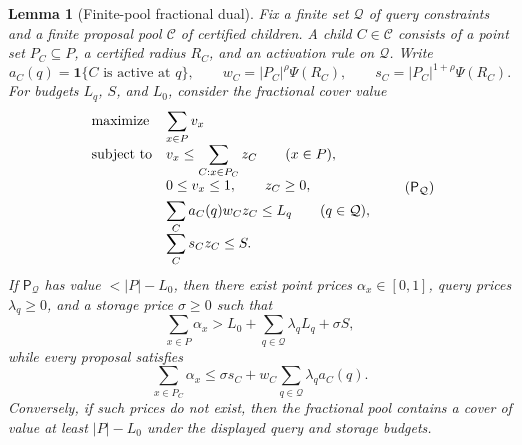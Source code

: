 \documentclass[10pt]{article}
\newtheorem{lemma}[theorem]{Lemma}
\theoremstyle{definition}
\begin{document}
\begin{lemma}[Finite-pool fractional dual]\label{lem:finite-pool-dual}
   Fix a finite set $\mathcal Q$ of query constraints and a finite proposal pool
   $\mathcal C$ of certified children.  A child $C\in\mathcal C$ consists of a
   point set $P_C\subseteq P$, a certified radius $R_C$, and an activation rule
   on $\mathcal Q$.  Write
   \[
      a_C(q)=\mathbf 1\{C\text{ is active at }q\},
      \qquad
      w_C=|P_C|^\rho\Psi(R_C),
      \qquad
      s_C=|P_C|^{1+\rho}\Psi(R_C).
   \]
   For budgets $L_q$, $S$, and $L_0$, consider the fractional cover value
   \[
   \begin{array}{ll}
   \text{\rm maximize} & \displaystyle \sum_{x\in P} v_x \\[0.4em]
   \text{\rm subject to}
      & \displaystyle
        v_x\le \sum_{C:x\in P_C} z_C
        \qquad (x\in P),\\[0.8em]
      & 0\le v_x\le1,\qquad z_C\ge0,\\[0.4em]
      & \displaystyle
        \sum_C a_C(q)w_Cz_C\le L_q
        \qquad (q\in\mathcal Q),\\[0.8em]
      & \displaystyle
        \sum_C s_Cz_C\le S .
   \end{array}
   \tag{$\mathsf{P}_{\mathcal Q}$}
   \]
   If $\mathsf{P}_{\mathcal Q}$ has value $< |P|-L_0$, then there exist
   point prices $\alpha_x\in[0,1]$, query prices $\lambda_q\ge0$, and a storage
   price $\sigma\ge0$ such that
   \[
      \sum_{x\in P}\alpha_x
      >
      L_0+\sum_{q\in\mathcal Q}\lambda_qL_q+\sigma S,
      \tag{D1}
   \]
   while every proposal satisfies
   \[
      \sum_{x\in P_C}\alpha_x
      \le
      \sigma s_C+
      w_C\sum_{q\in\mathcal Q} \lambda_q a_C(q).
      \tag{D2}
   \]
   Conversely, if such prices do not exist, then the fractional pool contains a
   cover of value at least $|P|-L_0$ under the displayed query and storage
   budgets.
\end{lemma}
\end{document}
